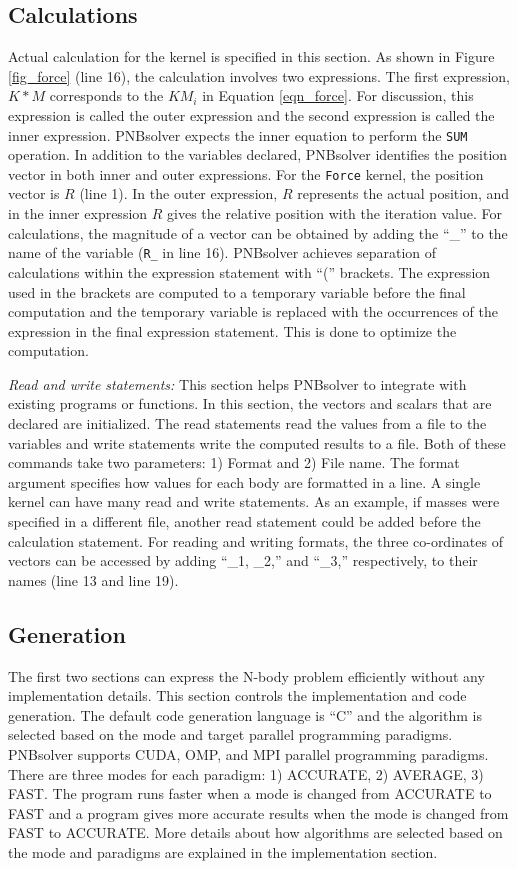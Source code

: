 \documentclass[draftclsnofoot]{elsarticle}
\begin{document}
\subsection{Calculations}
Actual calculation for the kernel is specified in this section. As shown in Figure \ref{fig_force} (line 16), the calculation involves two expressions. The first expression, 
$K*M$ corresponds to the $KM_i$ in Equation \ref{eqn_force}. For discussion, this expression is called the outer expression and the second expression is called the inner expression. 
PNBsolver expects the inner equation to perform the \texttt{SUM} operation. In addition to the variables declared, PNBsolver identifies the position 
vector in both inner and outer expressions. For the \texttt{Force} kernel, the position vector is $R$ (line 1). In the outer expression, $R$ represents the actual position, and in the
inner expression $R$ gives the relative position with the iteration value. For calculations, the  magnitude of a vector can be obtained by adding the ``\_'' to the name of the 
variable (\texttt{R\_} in line 16). PNBsolver achieves separation of calculations within the expression statement with ``('' brackets. The expression used in the brackets are computed to 
a temporary variable before the final computation and the temporary variable is replaced with the occurrences of the expression in the final expression statement. This is done to
optimize the computation.  

\textit{Read and write statements: }
This section helps PNBsolver to integrate with existing programs or functions. In this section, the vectors and scalars that are declared are initialized. 
The read statements read the values from a file to the variables and write statements write the computed results to a file. Both of these commands take two 
parameters: 1) Format and 2) File name. The format argument specifies how values for each body are formatted in a line. A single kernel can have many read 
and write statements. As an example, if masses were specified in a different file, another read statement could be added before the calculation statement. 
For reading and writing formats, the three co-ordinates of vectors can be accessed by adding ``\_1, \_2,'' and ``\_3,'' respectively, to their names (line 13 and line 19). 

\subsection{Generation}
The first two sections can express the N-body problem efficiently without any implementation details. This section controls the implementation and  code generation. 
The default code generation language is ``C'' and the algorithm is selected based on the mode and target parallel programming paradigms. PNBsolver supports 
CUDA, OMP, and MPI  parallel programming paradigms. There are three modes for each paradigm: 1) ACCURATE, 2) AVERAGE, 3) FAST.  The program runs faster 
when a mode is changed from ACCURATE to FAST and  a program gives more accurate results when the mode is changed from FAST to ACCURATE. More details about how 
algorithms are selected based on the mode and paradigms are explained in the implementation section.
\end{document}
